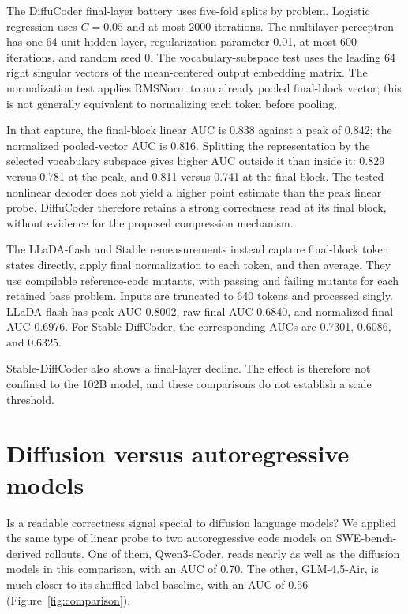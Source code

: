 The DiffuCoder final-layer battery uses five-fold splits by problem. Logistic regression uses $C=0.05$ and at most 2000 iterations. The multilayer perceptron has one 64-unit hidden layer, regularization parameter 0.01, at most 600 iterations, and random seed 0. The vocabulary-subspace test uses the leading 64 right singular vectors of the mean-centered output embedding matrix. The normalization test applies RMSNorm to an already pooled final-block vector; this is not generally equivalent to normalizing each token before pooling.

In that capture, the final-block linear AUC is 0.838 against a peak of 0.842; the normalized pooled-vector AUC is 0.816. Splitting the representation by the selected vocabulary subspace gives higher AUC outside it than inside it: 0.829 versus 0.781 at the peak, and 0.811 versus 0.741 at the final block. The tested nonlinear decoder does not yield a higher point estimate than the peak linear probe. DiffuCoder therefore retains a strong correctness read at its final block, without evidence for the proposed compression mechanism.

The LLaDA-flash and Stable remeasurements instead capture final-block token states directly, apply final normalization to each token, and then average. They use compilable reference-code mutants, with passing and failing mutants for each retained base problem. Inputs are truncated to 640 tokens and processed singly. LLaDA-flash has peak AUC 0.8002, raw-final AUC 0.6840, and normalized-final AUC 0.6976. For Stable-DiffCoder, the corresponding AUCs are 0.7301, 0.6086, and 0.6325.

Stable-DiffCoder also shows a final-layer decline. The effect is therefore not confined to the 102B model, and these comparisons do not establish a scale threshold.

\clearpage
\section{Diffusion versus autoregressive models}\label{app:comparison}\label{app:architecture}

Is a readable correctness signal special to diffusion language models? We applied the same type of linear probe to two autoregressive code models on SWE-bench-derived rollouts. One of them, Qwen3-Coder, reads nearly as well as the diffusion models in this comparison, with an AUC of 0.70. The other, GLM-4.5-Air, is much closer to its shuffled-label baseline, with an AUC of 0.56 (Figure~\ref{fig:comparison}).

